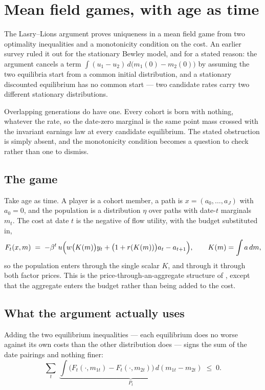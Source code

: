 \section{Mean field games, with age as time}\label{sec:mfg}

The Lasry--Lions argument \citep{LasryLions2007} proves uniqueness in a mean field game from two
optimality inequalities and a monotonicity condition on the cost. An earlier survey ruled it out
for the stationary Bewley model, and for a stated reason: the argument cancels a term
$\int(u_1-u_2)\,d\bigl(m_1(0)-m_2(0)\bigr)$ by assuming the two equilibria start from a common
initial distribution, and a stationary discounted equilibrium has no common start --- two
candidate rates carry two different stationary distributions.

Overlapping generations do have one. Every cohort is born with nothing, whatever the rate, so the
date-zero marginal is the same point mass crossed with the invariant earnings law at every
candidate equilibrium. The stated obstruction is simply absent, and the monotonicity condition
becomes a question to check rather than one to dismiss.

\subsection{The game}

Take age as time. A player is a cohort member, a path is
$x=(a_0,\dots,a_{J})$ with $a_0=0$, and the population is a distribution $\eta$ over paths with
date-$t$ marginals $m_t$. The cost at date $t$ is the negative of flow utility, with the budget
substituted in,
\[
  F_t(x,m) \;=\; -\beta^{t}\,u\Bigl(w\bigl(K(m)\bigr)y_t+\bigl(1+r(K(m))\bigr)a_t-a_{t+1}\Bigr),
  \qquad K(m)=\int a\,dm ,
\]
so the population enters through the single scalar $K$, and through it through both factor prices.
This is the price-through-an-aggregate structure of \citet{GraberMatter2024}, except that the
aggregate enters the budget rather than being added to the cost.

\subsection{What the argument actually uses}

Adding the two equilibrium inequalities --- each equilibrium does no worse against its own costs
than the other distribution does --- signs the sum of the date pairings and nothing finer:
\[
  \sum_{t}\;\underbrace{\int\bigl(F_t(\cdot,m_{1t})-F_t(\cdot,m_{2t})\bigr)\,d(m_{1t}-m_{2t})}
  _{\textstyle P_t}\;\le\;0 .
\]

